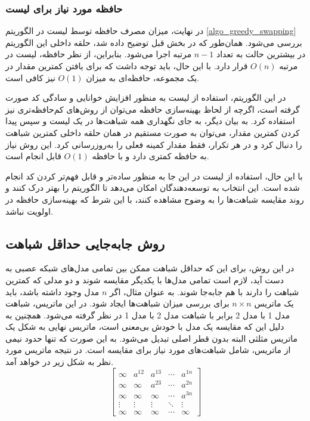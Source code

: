 \vspace{3mm}
\subsubsection{
	حافظه مورد نیاز برای لیست
}\vspace{-1mm}
در نهایت، میزان مصرف حافظه توسط لیست
در الگوریتم
 \ref{algo_greedy_swapping} 
بررسی می‌شود. همان‌طور که در بخش قبل توضیح داده شد، حلقه داخلی این الگوریتم در بیشترین حالت به تعداد \(n-1\) مرتبه اجرا می‌شود. بنابراین، از نظر حافظه، لیست
در مرتبه \(O(n)\) قرار دارد. با این حال، باید توجه داشت که برای یافتن کمترین مقدار در یک مجموعه، حافظه‌ای به میزان \(O(1)\) نیز کافی است. 

در این الگوریتم، استفاده از لیست
به منظور افزایش خوانایی و سادگی کد صورت گرفته است، اگرچه از لحاظ بهینه‌سازی حافظه می‌توان از روش‌های کم‌حافظه‌تری نیز استفاده کرد. به بیان دیگر، به جای نگهداری همه شباهت‌ها در یک لیست و سپس پیدا کردن کمترین مقدار، می‌توان به صورت مستقیم در همان حلقه داخلی کمترین شباهت را دنبال کرد و در هر تکرار، فقط مقدار کمینه فعلی را به‌روزرسانی کرد. این روش نیاز به حافظه کمتری دارد و با حافظه \(O(1)\) قابل انجام است.

با این حال، استفاده از لیست
در این جا به منظور ساده‌تر و قابل فهم‌تر کردن کد انجام شده است. این انتخاب به توسعه‌دهندگان امکان می‌دهد تا الگوریتم را بهتر درک کنند و روند مقایسه شباهت‌ها را به وضوح مشاهده کنند، با این شرط که بهینه‌سازی حافظه در اولویت نباشد.




\subsection{
	روش جابه‌جایی حداقل شباهت%
}
در این روش، برای این که حداقل شباهت ممکن بین تمامی مدل‌های شبکه عصبی به دست آید، لازم است تمامی مدل‌ها با یکدیگر مقایسه شوند و دو مدلی که کمترین شباهت را دارند با هم جابه‌جا شوند. به عنوان مثال، اگر \( n \) مدل وجود داشته باشد، باید یک ماتریس \( n \times n \) برای بررسی میزان شباهت‌ها ایجاد شود. در این ماتریس، شباهت مدل 1 با مدل 2 برابر با شباهت مدل 2 با مدل 1 در نظر گرفته می‌شود. همچنین به دلیل این که مقایسه یک مدل با خودش بی‌معنی است، ماتریس نهایی به شکل یک ماتریس مثلثی%
البته بدون قطر اصلی تبدیل می‌شود. به این صورت که تنها حدود نیمی از ماتریس، شامل شباهت‌های مورد نیاز برای مقایسه است. در نتیجه ماتریس مورد نظر به شکل زیر در خواهد آمد.
\begin{equation}
	\begin{bmatrix}
		\infty & a^{12} & a^{13} & \cdots & a^{1n} \\
		\infty & \infty & a^{23} & \cdots & a^{2n} \\
		\infty & \infty & \infty & \cdots & a^{3n} \\
		\vdots & \vdots & \vdots & \ddots & \vdots \\
		\infty & \infty & \infty & \cdots & \infty
	\end{bmatrix}
	\label{eq_similarity_matrix}
\end{equation}

